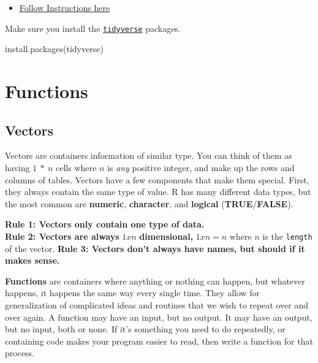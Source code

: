 \documentclass[
]{book}
\newenvironment{Shaded}{\begin{snugshade}}{\end{snugshade}}
\newcommand{\FunctionTok}[1]{\textcolor[rgb]{0.00,0.00,0.00}{#1}}
\newcommand{\NormalTok}[1]{#1}
\newcommand{\StringTok}[1]{\textcolor[rgb]{0.31,0.60,0.02}{#1}}
\providecommand{\tightlist}{%
  \setlength{\itemsep}{0pt}\setlength{\parskip}{0pt}}
\begin{document}
\begin{itemize}
  \begin{itemize}
  \tightlist
  \item
    \href{https://towardsdatascience.com/how-to-use-the-reddit-api-in-python-5e05ddfd1e5c}{Follow Instructions here}
  \end{itemize}
\end{itemize}

Make sure you install the \href{https://www.tidyverse.org/}{\texttt{tidyverse}} packages.

\begin{Shaded}
\begin{Highlighting}[]
\FunctionTok{install.packages}\NormalTok{(}\StringTok{\textquotesingle{}tidyverse\textquotesingle{}}\NormalTok{)}
\end{Highlighting}
\end{Shaded}

\hypertarget{functions}{%
\chapter{Functions}\label{functions}}

\hypertarget{vectors}{%
\section{Vectors}\label{vectors}}

Vectors are containers information of similar type. You can think of them as having \(1\ * \ n\) cells where \(n\) is \emph{any} positive integer, and make up the rows and columns of tables. Vectors have a few components that make them special. First, they always contain the same type of value. R has many different data types, but the most common are \textbf{numeric}, \textbf{character}, and \textbf{logical} (\textbf{TRUE}/\textbf{FALSE}).

\textbf{Rule 1: Vectors only contain one type of data.\\
Rule 2: Vectors are always} \(1xn\) \textbf{dimensional,} \(1xn=n\) where \(n\) is the \texttt{length} of the vector. \textbf{\hfill\break
Rule 3: Vectors don't always have names, but should if it makes sense.}

\textbf{Functions} are containers where anything or nothing can happen, but whatever happens, it happens the same way every single time. They allow for generalization of complicated ideas and routines that we wish to repeat over and over again. A function may have an input, but no output. It may have an output, but no input, both or none. If it's something you need to do repeatedly, or containing code makes your program easier to read, then write a function for that process.
\end{document}
